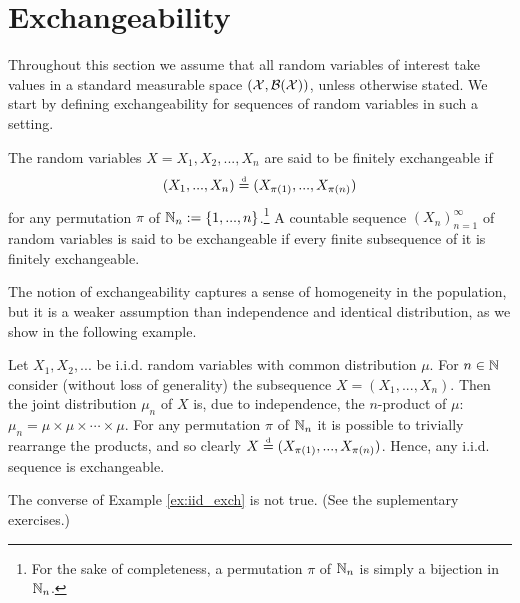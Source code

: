 

\section{Exchangeability} \label{section:exchangeability}


Throughout this section we assume that all random variables of interest take values in a standard measurable space $(\mathcal{X}, \mathcal{B}(\mathcal{X}))$, unless otherwise stated. We start by defining exchangeability for sequences of random variables in such a setting.

\begin{definition}[Exchangeability] \label{def:exchangeability}
	The random variables $X = X_1, X_2, ..., X_n$ are said to be finitely exchangeable if
	\begin{equation*}
		(X_1, ..., X_n) \stackrel{\text{\rm\tiny d}}{=} (X_{\pi(1)}, ..., X_{\pi(n)})
	\end{equation*}
	for any permutation $\pi$ of $\mathbb{N}_n :=\{1, ..., n \}$.\footnote{For the sake of completeness, a permutation $\pi$ of $\mathbb{N}_n$ is simply a bijection in $\mathbb{N}_n$.} A countable sequence $(X_n)_{n=1}^{\infty}$ of random variables is said to be exchangeable if every finite subsequence of it is finitely exchangeable.
\end{definition}

The notion of exchangeability captures a sense of homogeneity in the population, but it is a weaker assumption than independence and identical distribution, as we show in the following example.


\begin{mdframed}[backgroundcolor=mygray] 
	\begin{example} \label{ex:iid_exch}
		Let $X_1, X_2, ...$ be i.i.d. random variables with common distribution $\mu$. For $n \in \mathbb{N}$ consider (without loss of generality) the subsequence $X = (X_1, ..., X_n)$. Then the joint distribution $\mu_n$ of $X$ is, due to independence, the $n$-product of $\mu$: $\mu_n = \mu \times \mu \times \cdots \times \mu$. For any permutation $\pi$ of $\mathbb{N}_n$ it is possible to trivially rearrange the products, and so clearly $X \stackrel{\text{\rm\tiny d}}{=} (X_{\pi(1)}, ..., X_{\pi(n)})$. Hence, any i.i.d. sequence is exchangeable.
	\end{example}
\end{mdframed}

The converse of Example \ref{ex:iid_exch} is not true. (See the suplementary exercises.) \\


